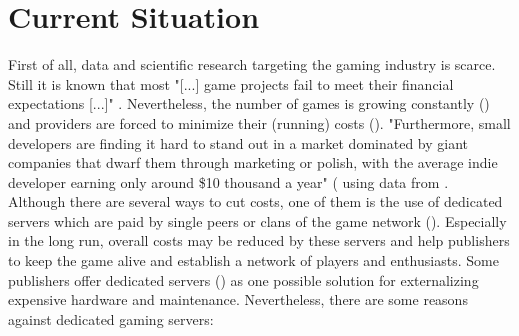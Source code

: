 \section{Current Situation}
\label{sec:CurrentSituation}
First of all, data and scientific research targeting the gaming industry is scarce.
Still it is known that  most "[...] game projects fail to meet their financial expectations [...]" \cite[17]{Bethke.2003}.
Nevertheless, the number of games is growing constantly (\cite{statista.com.2021}) and providers are forced
to minimize their (running) costs (\cite{Koster.2018}).
"Furthermore, small developers are finding it hard to stand out in a market dominated by giant companies that dwarf them through marketing or polish,
with the average indie developer earning only around \$10 thousand a year" (\citet[14]{Laneve.2019} using data from \citet[6]{Gamesetwatch.com.2014}. \\
Although there are several ways to cut costs, one of them is the use of dedicated servers which are paid by single peers or clans of the game network (\cite{Wikipedia.2021c}).
Especially in the long run, overall costs \cite[13]{Weilbacher.2012} may be reduced by these servers and help publishers to keep the game alive and establish a network of players and enthusiasts.
Some publishers offer dedicated servers (\cite{VALVe.2021}) as one possible solution for externalizing expensive hardware and maintenance.
Nevertheless, there are some reasons against dedicated gaming servers:
